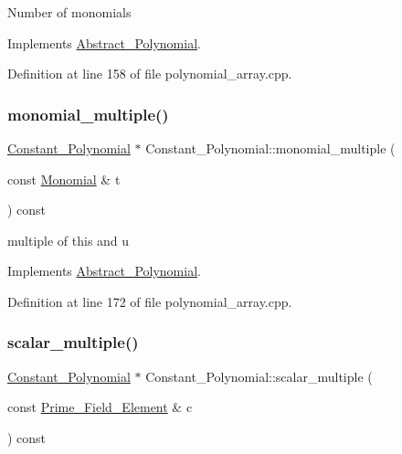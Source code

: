 Number of monomials 

Implements \hyperlink{class_abstract___polynomial_a48f4c3c030ca66a9386cd71f71d5def7}{Abstract\+\_\+\+Polynomial}.



Definition at line 158 of file polynomial\+\_\+array.\+cpp.

\mbox{\label{class_constant___polynomial_a6fc38722a446ef063905914bbb3ada10}} 
\subsubsection{\texorpdfstring{monomial\+\_\+multiple()}{monomial\_multiple()}}
{\footnotesize\ttfamily \hyperlink{class_constant___polynomial}{Constant\+\_\+\+Polynomial} $\ast$ Constant\+\_\+\+Polynomial\+::monomial\+\_\+multiple (\begin{DoxyParamCaption}\item[{const \hyperlink{class_monomial}{Monomial} \&}]{t }\end{DoxyParamCaption}) const\hspace{0.3cm}{\ttfamily [virtual]}}

multiple of this and u 

Implements \hyperlink{class_abstract___polynomial_aacee94ef63116201c91c7d65779097d8}{Abstract\+\_\+\+Polynomial}.



Definition at line 172 of file polynomial\+\_\+array.\+cpp.

\mbox{\label{class_constant___polynomial_aa86d083f9ab6f2026e85d9581146c788}} 
\subsubsection{\texorpdfstring{scalar\+\_\+multiple()}{scalar\_multiple()}}
{\footnotesize\ttfamily \hyperlink{class_constant___polynomial}{Constant\+\_\+\+Polynomial} $\ast$ Constant\+\_\+\+Polynomial\+::scalar\+\_\+multiple (\begin{DoxyParamCaption}\item[{const \hyperlink{class_prime___field___element}{Prime\+\_\+\+Field\+\_\+\+Element} \&}]{c }\end{DoxyParamCaption}) const\hspace{0.3cm}{\ttfamily [virtual]}}

